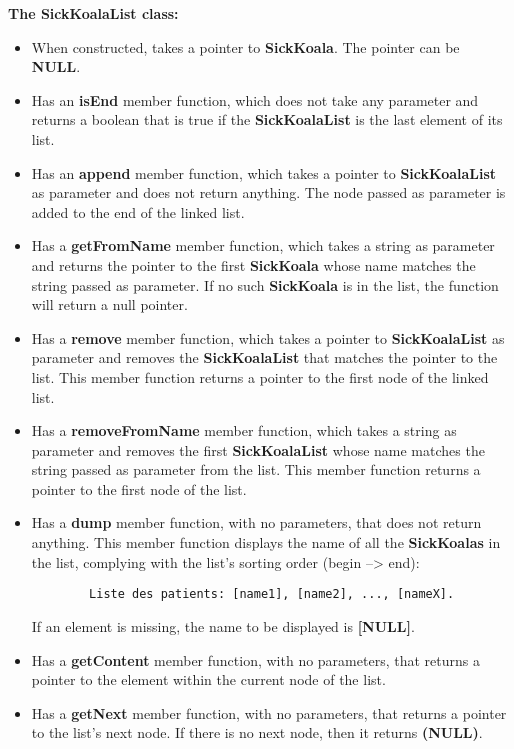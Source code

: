 \textbf{The SickKoalaList class:}
\begin{itemize}

  \item When constructed, takes a pointer to \textbf{SickKoala}. The pointer can
    be \textbf{NULL}.

  \item Has an \textbf{isEnd} member function, which does not take any parameter
    and returns a boolean that is true if the \textbf{SickKoalaList} is the last
    element of its list.

  \item Has an \textbf{append} member function, which takes a pointer to
    \textbf{SickKoalaList} as parameter and does not return anything. The node
    passed as parameter is added to the end of the linked list.

  \item Has a \textbf{getFromName} member function, which takes a string as
    parameter and returns the pointer to the first \textbf{SickKoala} whose
    name matches the string passed as parameter. If no such \textbf{SickKoala}
    is in the list, the function will return a null pointer.

  \item Has a \textbf{remove} member function, which takes a pointer to
    \textbf{SickKoalaList} as parameter and removes the \textbf{SickKoalaList} that
    matches the pointer to the list. This member function returns a pointer to
    the first node of the linked list.	

  \item Has a \textbf{removeFromName} member function, which takes a string as
    parameter and removes the first \textbf{SickKoalaList} whose name
    matches the string passed as parameter from the list. This member function
    returns a pointer to the first node of the list.


  \item Has a \textbf{dump} member function, with no parameters, that does not
    return anything. This member function displays the name of all the
    \textbf{SickKoalas} in the list, complying with the list's sorting order
    (begin --> end):
    \begin{lstlisting}
        Liste des patients: [name1], [name2], ..., [nameX].
    \end{lstlisting}
    If an element is missing, the name to be displayed is \textbf{[NULL]}.

  \item Has a \textbf{getContent} member function, with no parameters, that returns
    a pointer to the element within the current node of the list.

  \item Has a \textbf{getNext} member function, with no parameters, that returns
    a pointer to the list's next node. If there is no next node, then it
    returns \textbf{(NULL)}.
\end{itemize}
~\\

